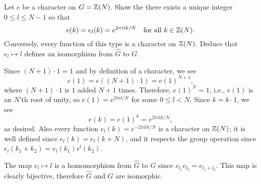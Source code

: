 \begin{exrc}[4]
    Let \(e\) be a character on \(G = \mathbb{Z}(N)\).
    Show the there exists a unique integer \(0 \leq l \leq N - 1\) so that
    \begin{equation*}
        e(k) = e_l(k) = e^{2 \pi i l k / N} \quad \text{for all \(k \in \mathbb{Z}(N)\)}.
    \end{equation*}
    Conversely, every function of this type is a character on \(\mathbb{Z}(N)\).
    Deduce that \(e_l \mapsto l\) defines an isomorphism from \(\hat{G}\) to \(G\).

\begin{soln}
    Since \((N + 1) \cdot 1 = 1\) and by definition of a character, we see
    \begin{equation*}
        e(1) = e((N + 1) \cdot 1) = e(1)^{N + 1},
    \end{equation*}
    where \((N + 1) \cdot 1\) is \(1\) added \(N + 1\) times.
    Therefore, \(e(1)^N = 1\), i.e., \(e(1)\) is an \(N\)'th root of unity,
    so \(e(1) = e^{2 \pi i l / N}\) for some \(0 \leq l < N\).
    Since \(k = k \cdot 1\), we see
    \begin{equation*}
        e(k) = e(1)^k = e^{2\pi i l k / N},
    \end{equation*}
    as desired.
    Also every function \(e_l(k) = e^{-2 \pi i l k / N}\)
    is a character on \(\mathbb{Z}(N)\);
    it is well defined since \(e_l(k) = e_l(k + N)\),
    and it respects the group operation since \(e_l(k_1 + k_2) = e_l(k_1)e^l(k_2)\).

    The map \(e_l \mapsto l\) is a homomorphism from \(\hat{G}\) to \(G\)
    since \(e_{l_1} e_{l_2} = e_{l_1 + l_2}\).
    This map is clearly bijective, therefore \(\hat{G}\) and \(G\) are isomorphic.

\end{soln}
\end{exrc}
